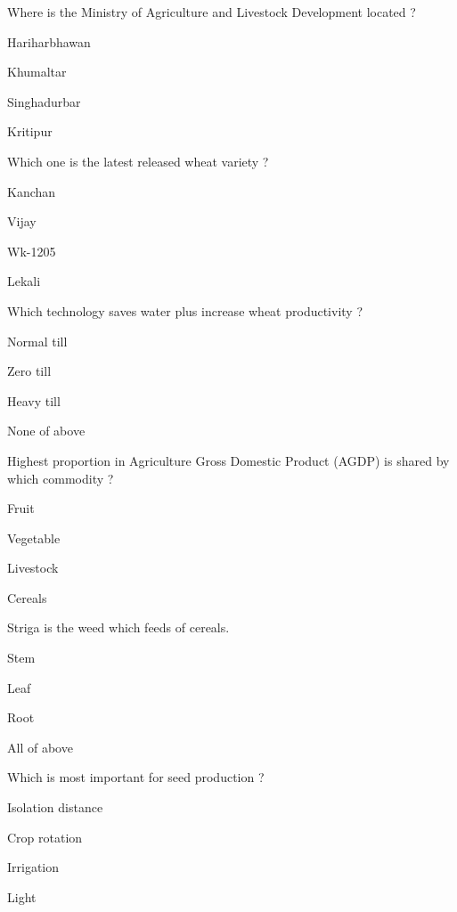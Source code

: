 \begin{questions}
\question Where is the Ministry of Agriculture and Livestock Development located ?
\begin{items}
\item Hariharbhawan
\item Khumaltar
\item* Singhadurbar
\item Kritipur
\end{items}

\question Which one is the latest released wheat variety ?
\begin{items}
\item Kanchan
\item* Vijay
\item Wk-1205
\item Lekali
\end{items}

\question Which technology saves water plus increase wheat productivity ?
\begin{items}
\item Normal till
\item* Zero till
\item Heavy till
\item None of above
\end{items}

\question Highest proportion in Agriculture Gross Domestic Product (AGDP) is shared by which commodity ?
\begin{items}
\item Fruit
\item Vegetable
\item Livestock
\item* Cereals
\end{items}

\question Striga is the weed which feeds \fillin[][3cm] of cereals.
\begin{items}
\item Stem
\item Leaf
\item* Root
\item All of above
\end{items}

\question Which is most important for seed production ?
\begin{items}
\item* Isolation distance
\item Crop rotation
\item Irrigation
\item Light
\end{items}


\end{questions}

